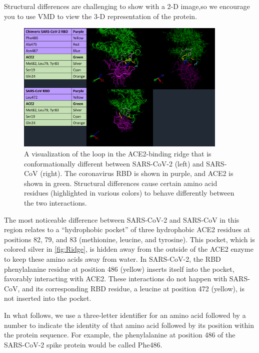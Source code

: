 Structural differences are challenging to show with a 2-D image,so we encourage you to use VMD to view the 3-D representation of the protein. 

\begin{qbox}\end{qbox}

\begin{figure}[h]
	\centering
	\mySfFamily
	\includegraphics[width = 0.9\textwidth]{../images/Ridge.png}
	\caption{A visualization of the loop in the ACE2-binding ridge that is conformationally different between SARS-CoV-2 (left) and SARS-CoV (right). The coronavirus RBD is shown in purple, and ACE2 is shown in green. Structural differences cause certain amino acid residues (highlighted in various colors) to behave differently between the two interactions.}
	\label{fig:Ridge}
\end{figure}

The most noticeable difference between SARS-CoV-2 and SARS-CoV in this region relates to a ``hydrophobic pocket'' of three hydrophobic ACE2 residues at positions 82, 79, and 83 (methionine, leucine, and tyrosine). This pocket, which is colored silver in \autoref{fig:Ridge}, is hidden away from the outside of the ACE2 enzyme to keep these amino acids away from water. In SARS-CoV-2, the RBD phenylalanine residue at position 486 (yellow) inserts itself into the pocket, favorably interacting with ACE2. These interactions do not happen with SARS-CoV, and its corresponding RBD residue, a leucine at position 472 (yellow), is not inserted into the pocket.

In what follows, we use a three-letter identifier for an amino acid followed by a number to indicate the identity of that amino acid followed by its position within the protein sequence. For example, the phenylalanine at position 486 of the SARS-CoV-2 spike protein would be called Phe486.

